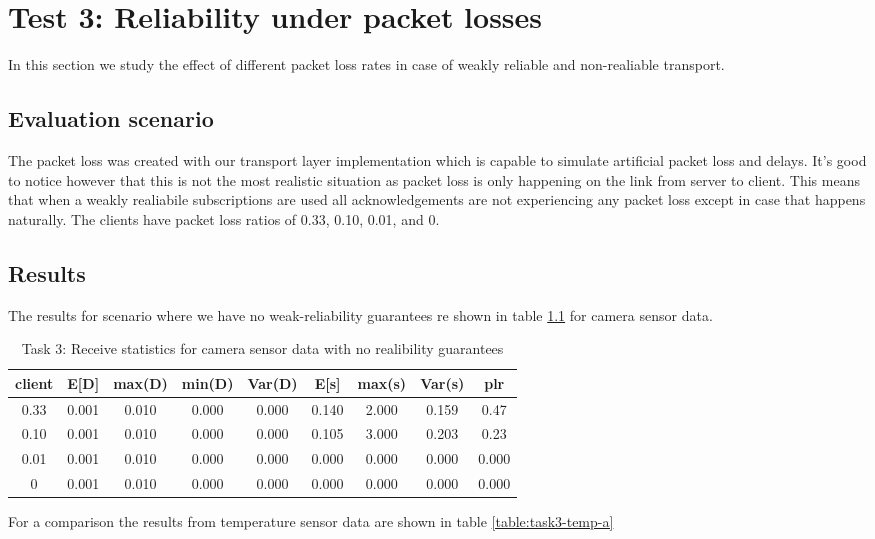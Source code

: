 \chapter{Test 3: Reliability under packet losses}
In this section we study the effect of different packet loss rates in case of
weakly reliable and non-realiable transport.

\section{Evaluation scenario}
The packet loss was created with our transport layer implementation which is
capable to simulate artificial packet loss and delays. It's good to notice
however that this is not the most realistic situation as packet loss is only
happening on the link from server to client. This means that when a weakly
realiabile subscriptions are used all acknowledgements are not experiencing any
packet loss except in case that happens naturally. The clients have packet loss
ratios of 0.33, 0.10, 0.01, and 0.


\section{Results}
The results for scenario where we have no weak-reliability guarantees 
re shown in table \ref{table:task3-camera-a} for camera sensor data. 
\begin{table}
\centering
\begin{tabular}{|c|c|c|c|c|c|c|c|c|}
\hline
client & E[D] & max(D) & min(D) & Var(D) & E[s] & max(s) & Var(s) & plr\\
\hline
 0.33 & 0.001 & 0.010 & 0.000 & 0.000 & 0.140 & 2.000 & 0.159 & 0.47 \\
\hline
0.10 & 0.001 & 0.010 & 0.000 & 0.000 & 0.105 & 3.000 & 0.203 & 0.23  \\
\hline
0.01 & 0.001 & 0.010 & 0.000 & 0.000 & 0.000 & 0.000 & 0.000 & 0.000 \\
\hline
0 & 0.001 & 0.010 & 0.000 & 0.000 & 0.000 & 0.000 & 0.000 & 0.000 \\
\hline
\end{tabular}
\caption{Task 3: Receive statistics for camera sensor data with no realibility guarantees}
\label{table:task3-camera-a}
\end{table}

For a comparison the results from temperature sensor data are shown in table
\ref{table:task3-temp-a}

